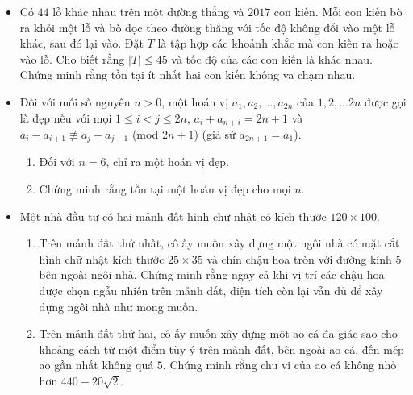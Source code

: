 \documentclass[11pt]{scrartcl}
\begin{document}
\begin{itemize}[label=, leftmargin=0em, itemsep=-0em]
\begin{btvn}
    \end{btvn}

    \item \begin{btvn} Có $44$ lỗ khác nhau trên một đường thẳng và $2017$ con kiến. Mỗi con kiến bò ra khỏi một lỗ và bò dọc theo đường thẳng với tốc độ không đổi vào một lỗ khác, sau đó lại vào. Đặt $T$ là tập hợp các khoảnh khắc mà con kiến ra hoặc vào lỗ. Cho biết rằng $|T|\leq 45$ và tốc độ của các con kiến là khác nhau. Chứng minh rằng tồn tại ít nhất hai con kiến không va chạm nhau.
    \end{btvn}

    \item \begin{btvn}
        Đối với mỗi số nguyên $n>0$, một hoán vị $a_1,a_2,\dots ,a_{2n}$ của $1,2,\dots 2n$ được gọi là đẹp nếu với mọi $1\leq i<j \leq 2n$, $a_i+a_{n+i}=2n+1$ và $a_i-a_{i+1}\not \equiv a_j-a_{j+1}$ (mod $2n+1$) (giả sử $a_{2n+1}=a_1$).
        \begin{enumerate}[label=(\alph*)]
            \item Đối với $n=6$, chỉ ra một hoán vị đẹp.
            \item Chứng minh rằng tồn tại một hoán vị đẹp cho mọi $n$.
        \end{enumerate}
    \end{btvn}

    \item \begin{btvn}
        Một nhà đầu tư có hai mảnh đất hình chữ nhật có kích thước $120\times 100$.
        \begin{enumerate}[label=(\alph*)]
            \item Trên mảnh đất thứ nhất, cô ấy muốn xây dựng một ngôi nhà có mặt cắt hình chữ nhật kích thước $25\times 35$ và chín chậu hoa tròn với đường kính $5$ bên ngoài ngôi nhà. Chứng minh rằng ngay cả khi vị trí các chậu hoa được chọn ngẫu nhiên trên mảnh đất, diện tích còn lại vẫn đủ để xây dựng ngôi nhà như mong muốn.
            \item Trên mảnh đất thứ hai, cô ấy muốn xây dựng một ao cá đa giác sao cho khoảng cách từ một điểm tùy ý trên mảnh đất, bên ngoài ao cá, đến mép ao gần nhất không quá $5$. Chứng minh rằng chu vi của ao cá không nhỏ hơn $440-20\sqrt{2}$.
        \end{enumerate}
    \end{btvn}


\end{itemize}
\end{document}
